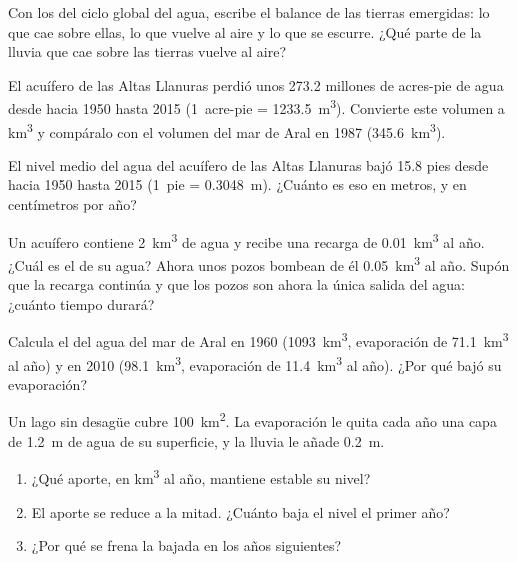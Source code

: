 \begin{exercise}[$\star\star$]\label{exo:g10:freshwater-resources:8}
Con los  del ciclo global del agua, escribe el balance de las tierras
emergidas: lo que cae sobre ellas, lo que vuelve al aire y lo que se escurre.
¿Qué parte de la lluvia que cae sobre las tierras vuelve al aire?
\end{exercise}

\begin{exercise}[$\star\star$]\label{exo:g10:freshwater-resources:9}
El acuífero de las Altas Llanuras perdió unos \num{273.2} millones de
acres-pie de agua desde hacia 1950 hasta 2015 (\num{1}~acre-pie =
\qty{1233.5}{m^3}). Convierte este volumen a \unit{km^3} y compáralo con el
volumen del mar de Aral en 1987 (\qty{345.6}{km^3}).
\end{exercise}

\begin{exercise}[$\star\star$]\label{exo:g10:freshwater-resources:10}
El nivel medio del agua del acuífero de las Altas Llanuras bajó \num{15.8}
pies desde hacia 1950 hasta 2015 (\num{1}~pie = \qty{0.3048}{m}). ¿Cuánto es
eso en metros, y en centímetros por año?
\end{exercise}

\begin{exercise}[$\star\star$]\label{exo:g10:freshwater-resources:11}
Un acuífero contiene \qty{2}{km^3} de agua y recibe una recarga de
\qty{0.01}{km^3} al año. ¿Cuál es el  de su agua? Ahora
unos pozos bombean de él \qty{0.05}{km^3} al año. Supón que la recarga
continúa y que los pozos son ahora la única salida del agua: ¿cuánto tiempo
durará?
\end{exercise}

\begin{exercise}[$\star\star\star$]\label{exo:g10:freshwater-resources:12}
Calcula el  del agua del mar de Aral en 1960
(\qty{1093}{km^3}, evaporación de \qty{71.1}{km^3} al año) y en 2010
(\qty{98.1}{km^3}, evaporación de \qty{11.4}{km^3} al año). ¿Por qué bajó su
evaporación?
\end{exercise}

\begin{exercise}[$\star\star\star$]\label{exo:g10:freshwater-resources:13}
Un lago sin desagüe cubre \qty{100}{km^2}. La evaporación le quita cada año
una capa de \qty{1.2}{m} de agua de su superficie, y la lluvia le añade
\qty{0.2}{m}.
\begin{enumerate}
  \item ¿Qué aporte, en \unit{km^3} al año, mantiene estable su nivel?
  \item El aporte se reduce a la mitad. ¿Cuánto baja el nivel el primer
        año?
  \item ¿Por qué se frena la bajada en los años siguientes?
\end{enumerate}
\end{exercise}

